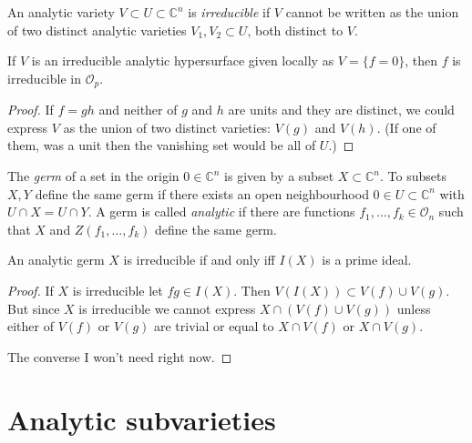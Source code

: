 \begin{definition}
\label{definition-irreducible-variety}
An analytic variety $V\subset U\subset \mathbb{C}^n$ is {\it irreducible} if
$V$ cannot be written as the union of two distinct analytic varieties 
$V_1,V_2\subset U$, both distinct to $V$.
\end{definition}

\begin{lemma}
\label{lemma-irreducible-analytic-hypersurface-irreducible-polynomial}
If $V$ is an irreducible analytic hypersurface given locally as $V=\{f=0\}$, 
then $f$ is irreducible in $\mathcal{O}_p$.
\end{lemma}

\begin{proof}
If $f=gh$ and neither of $g$ and $h$ are units and they are distinct, we could 
express $V$ as the union of two distinct varieties: $V(g)$ and $V(h)$. (If one 
of them, was a unit then the vanishing set would be all of $U$.)
\end{proof}

\begin{definition}
\label{definition-germ-of-set}
\begin{reference}
\cite[Definition 1.1.21]{huc}
\end{reference}
The {\it germ} of a set in the origin $0\in \mathbb{C}^n$ is given by a subset
$X \subset \mathbb{C}^n$. To subsets $X,Y$ define the same germ if there exists
an open neighbourhood $0 \in U\subset \mathbb{C}^n$ with $U\cap X=U\cap Y$. A
germ is called {\it analytic} if there are functions $f_1,\ldots,f_k\in
\mathcal{O}_n$ such that $X$ and $Z(f_1,\ldots,f_k)$ define the same germ.
\end{definition}

\begin{lemma}
\label{lemma-analytic-germ-is-irreducible-iff-prime-ideal}
\cite[Lemma 1.1.28]{huc}
An analytic germ $X$ is irreducible if and only iff $I(X)$ is a prime ideal.
\end{lemma}

\begin{proof}
If $X$ is irreducible let $fg\in I(X)$. Then $V(I(X))\subset V(f)\cup V(g)$. But
since $X$ is irreducible we cannot express $X \cap (V(f) \cup  V(g))$ unless
either of $V(f)$ or $V(g)$ are trivial or equal to $X \cap V(f)$ or $X \cap
V(g)$.

The converse I won't need right now.
\end{proof}

\section{Analytic subvarieties}
\label{section-analytic-subvarieties}

